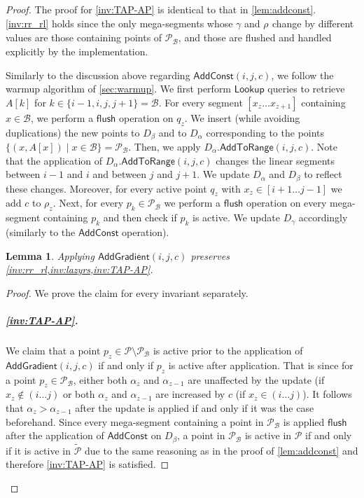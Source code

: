 \documentclass[10pt,a4paper]{article}
\newtheorem{lemma}[theorem]{Lemma}
\newcommand{\AC}{\mathsf{AddConst}}
\newcommand{\AtR}{\mathsf{AddToRange}}
\newcommand{\AG}{\mathsf{AddGradient}}
\newcommand{\Lookup}{\mathsf{Lookup}}
\renewcommand{\P}{\mathcal{P}}
\newcommand{\DAL}{D_{\alpha}}
\newcommand{\Dbeta}{D_{\beta}}
\newcommand{\DGAM}{D_{\gamma}}
\newcommand{\TP}{\tilde{\P}}
\newcommand{\para}[1]{\vspace{-0.1in} \subparagraph*{#1}}
\newcommand{\B}{\mathcal{B}}
\newcommand{\rl}[1]{\rho_{#1}}
\newcommand{\flush}{\mathsf{flush}}
\begin{document}
\begin{proof}
The proof for \cref{inv:TAP-AP} is identical to that in \cref{lem:addconst}. 
\cref{inv:rr_rl} holds since the only mega-segments whose $\gamma$ and $\rl{}$ change by different values are those containing points of $\P_{\B}$, and those are flushed and handled explicitly by the implementation.
  
\iffalse 
Similarly to the discussion above regarding $\AC(i,j,c)$, we follow the warmup algorithm of \cref{sec:warmup}.
We first perform $\Lookup$ queries to retrieve $A[k]$ for $k\in\{i-1,i,j,j+1\}=\B$.
For every segment $[x_z \ldots x_{z+1}]$ containing $x\in \B$, we perform a $\flush$ operation on $q_z$.
We insert (while avoiding duplications) the new points to $\Dbeta$ and to $\DAL$ corresponding to the points $\{(x,A[x])\mid x\in \B\}=\P_{\B}$.
Then, we apply $\DAL.\AtR(i,j,c)$. 
Note that the application of $\DAL.\AtR(i,j,c)$ changes the linear segments between $i-1$ and $i$ and between $j$ and $j+1$.
We update $\DAL$ and $\Dbeta$ to reflect these changes.
Moreover, for every active point $q_z$ with $x_z\in [i+1\ldots j-1]$ we add $c$ to $\rl{z}$.
Next, for every $p_k \in \P_{\B}$ we perform a $\flush$ operation on every mega-segment containing $p_k$ and then check if $p_k$ is active.
We update $\DGAM$ accordingly (similarly to the $\AC$ operation).

\begin{lemma}\label{lem:addgrad}
    Applying $\AG(i,j,c)$ preserves \cref{inv:rr_rl,inv:lazyrs,inv:TAP-AP}.
\end{lemma}
\begin{proof}
We prove the claim for every invariant separately.
\para{\cref{inv:TAP-AP}.}
We claim that a point $p_z \in \P \setminus \P_{\B}$ is active prior to the application of $\AG(i,j,c)$ if and only if $p_z$ is active after application.
That is since for a point $p_z \in \P_{\B}$, either both $\alpha_z$ and $\alpha_{z-1}$ are unaffected by the update (if $x_z \notin (i\ldots j)$ or both $\alpha_z$ and $\alpha_{z-1}$ are increased by $c$ (if $x_z \in (i\ldots j)$).
It follows that $\alpha_z >\alpha_{z-1}$ after the update is applied if and only if it was the case beforehand.
Since every mega-segment containing a point in $\P_{\B}$ is applied $\flush$ after the application of $\AC$ on $\Dbeta$, a point in $\P_{\B}$ is active in $\P$ if and only if it is active in $\TP$ due to the same reasoning as in the proof of \cref{lem:addconst} and therefore \cref{inv:TAP-AP} is satisfied.


\end{proof}
\end{proof}
\end{document}
